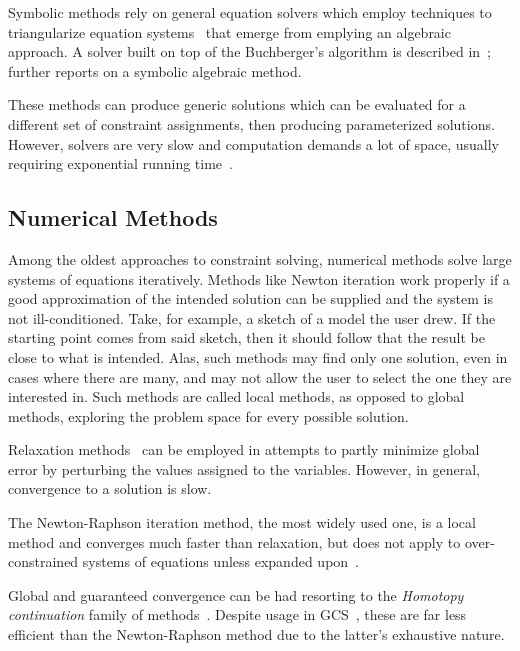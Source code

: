 Symbolic methods rely on general equation solvers which employ techniques to
triangularize equation systems~\cite{Chou:1988:IWMMTPG,Buchberger:1995:Grobner}
that emerge from emplying an algebraic approach.  A solver built on top of the
Buchberger's algorithm is described in~\cite{Buchanan:1993:CDS};
 further reports on a symbolic algebraic method.

These methods can produce generic solutions which can be evaluated for a
different set of constraint assignments, then producing parameterized solutions.
However, solvers are very slow and computation demands a lot of space, usually
requiring exponential running time~\cite{Durand:1998:SNTCS}.

\subsection{Numerical Methods}%
\label{sec:intro.constraints.numerical}

Among the oldest approaches to constraint solving, numerical methods solve large
systems of equations iteratively.  Methods like Newton iteration work properly
if a good approximation of the intended solution can be supplied and the system
is not ill-conditioned.  Take, for example, a sketch of a model the user drew.
If the starting point comes from said sketch, then it should follow that the
result be close to what is intended.  Alas, such methods may find only one
solution, even in cases where there are many, and may not allow the user to
select the one they are interested in.  Such methods are called local methods,
as opposed to global methods, exploring the problem space for every possible
solution.

Relaxation
methods~\cite{Sutherland:1964:Sketchpad,Hillyard:1978:CNSTDT,Borning:1989:PLATL}
can be employed in attempts to partly minimize global error by perturbing the
values assigned to the variables.  However, in general, convergence to a
solution is slow.

The Newton-Raphson iteration method, the most widely used one, is a local method
and converges much faster than relaxation, but does not apply to
over-constrained systems of equations unless expanded
upon~\cite{Dedieu:2000:Newton}.

Global and guaranteed convergence can be had resorting to the \textit{Homotopy
continuation} family of methods~\cite{Allgower:1993:CPF}.  Despite usage in
\ac{GCS}~\cite{Lamure:1996:SGCH,Durand:1998:SNTCS}, these are far less efficient
than the Newton-Raphson method due to the latter's exhaustive nature.

